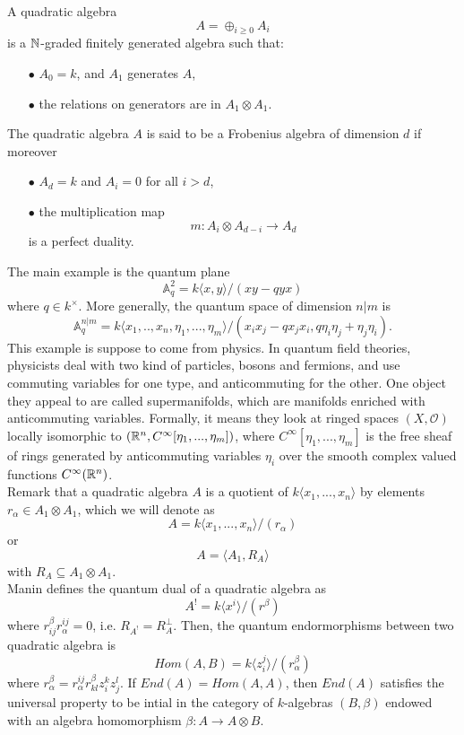 \begin{definition}
A quadratic algebra 
\[A= \oplus_{i\geq 0} A_i\] 
is a $\mathbb N$-graded finitely generated algebra such that:
\begin{itemize}
\item[$\bullet$] $A_0 = k$, and $A_1$ generates $A$,
\item[$\bullet$] the relations on generators are in $A_1 \otimes A_1$. 
\end{itemize} 
The quadratic algebra $A$ is said to be a Frobenius algebra of dimension $d$ if moreover 
\begin{itemize}
\item[$\bullet$] $A_d= k$ and $A_i =0$ for all $i>d$,
\item[$\bullet$] the multiplication map
\[m : A_i \otimes A_{d-i} \rightarrow A_d\]
is a perfect duality.
\end{itemize}
\end{definition}

The main example is the quantum plane
\[\mathbb A_q^{2} = k\langle x,y \rangle / (xy -qyx)\]
where $q\in k^\times$. More generally, the quantum space of dimension $n|m$ is
\[ \mathbb A_q^{n|m} = k\langle x_1,.. ,x_n , \eta_1,...,\eta_m \rangle / (x_i x_j - q x_j x_i , q \eta_i \eta_j +  \eta_j \eta_i).\]
This example is suppose to come from physics. In quantum field theories, physicists deal with two kind of particles, bosons and fermions, and use commuting variables for one type, and anticommuting for the other. One object they appeal to are called supermanifolds, which are manifolds enriched with anticommuting variables. Formally, it means they look at ringed spaces $(X,\mathcal O)$ locally isomorphic to $(\mathbb R^n, C^\infty [\eta_1,...,\eta_m])$, where $C^\infty [\eta_1,...,\eta_m]$ is the free sheaf of rings generated by anticommuting variables $\eta_i$ over the smooth complex valued functions $C^\infty(\mathbb R^n)$.\\

Remark that a quadratic algebra $A$ is a quotient of $k\langle x_1,... ,x_n\rangle$ by elements $r_\alpha \in A_1 \otimes A_1$, which we will denote as 
\[A= k\langle x_1,... ,x_n\rangle / (r_\alpha)\]
or \[A= \langle A_1, R_A\rangle\]
with $R_A \subseteq A_1 \otimes A_1$.\\

Manin defines the quantum dual of a quadratic algebra as
\[A^{!} = k\langle x^i\rangle / (r^\beta)\]
where $r^\beta_{ij}r^{ij}_\alpha = 0$, i.e. $R_{A^!}=R_{A}^\perp$. Then, the quantum endormorphisms between two quadratic algebra is
\[Hom(A,B) =k\langle z^j_i\rangle / (r_\alpha^\beta)\]
where $r_\alpha^\beta = r_\alpha^{ij}r^\beta_{kl} z_i^k z_j^l$. If $End(A)= Hom(A,A)$, then $End(A)$ satisfies the universal property to be intial in the category of $k$-algebras $(B,\beta)$ endowed with an algebra homomorphism $\beta: A \rightarrow A\otimes B$.\\ 

